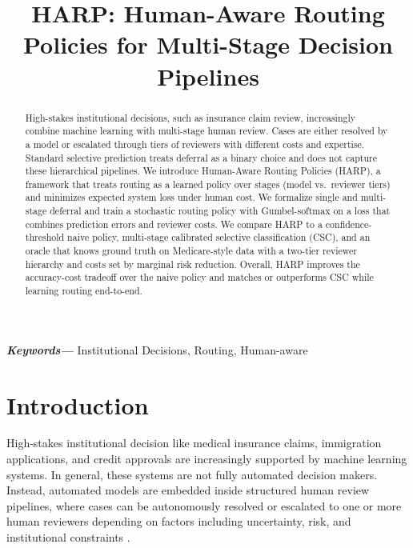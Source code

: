 \documentclass[conference]{IEEEtran}
\begin{document}
\title{\LARGE \textbf{HARP: Human-Aware Routing Policies for Multi-Stage Decision Pipelines}}

\author{
}

\maketitle

\begin{abstract}
High-stakes institutional decisions, such as insurance claim review, increasingly 
combine machine learning with multi-stage human review. Cases are either resolved by a 
model or escalated through tiers of reviewers with different costs and expertise. Standard 
selective prediction treats deferral as a binary choice and does not capture these hierarchical 
pipelines. We introduce Human-Aware Routing Policies (HARP), a framework that treats routing 
as a learned policy over stages (model vs.\ reviewer tiers) and minimizes expected system loss 
under human cost. We formalize single and multi-stage deferral and train a stochastic routing 
policy with Gumbel-softmax on a loss that combines prediction errors and reviewer costs. We compare 
HARP to a confidence-threshold naive policy, multi-stage calibrated selective classification (CSC),
and an oracle that knows ground truth on Medicare-style data with a two-tier reviewer hierarchy and
costs set by marginal risk reduction. Overall, HARP improves the accuracy-cost tradeoff over the 
naive policy and matches or outperforms CSC while learning routing end-to-end.
\end{abstract}

\hfill\break
{\small
\textbf{\textit{Keywords---}}
Institutional Decisions, Routing, Human-aware
}

\IEEEpeerreviewmaketitle

\section{Introduction}

High-stakes institutional decision like medical insurance claims, 
immigration applications, and credit approvals are increasingly supported
by machine learning systems. In general, these systems are not fully 
automated decision makers. Instead, automated models are embedded inside
structured human review pipelines, where cases can be autonomously resolved
or escalated to one or more human reviewers depending on factors including
uncertainty, risk, and institutional constraints \cite{kleinberg2017,cowgill2019}.
\end{document}
